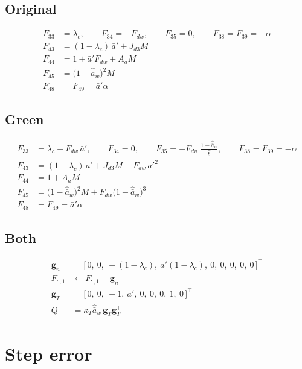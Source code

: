 \documentclass[11pt,a4paper,fontset=none]{ctexart}
\newcommand{\ba}{\bar{a}}
\newcommand{\ap}{\ba'}
\newcommand{\ah}{\hat{\ba}_w}
\newcommand{\bh}{\hat{b}}
\begin{document}
\subsection*{Original}

\begin{align*}
F_{33} &= \lambda_c, \qquad F_{34} = -F_{dw}, \qquad F_{35} = 0, \qquad F_{38} = F_{39} = -\alpha \\
F_{43} &= (1-\lambda_c)\,\ap + J_{d3}M \\
F_{44} &= 1 + \ap F_{dw} + A_a M \\
F_{45} &= \bigl(1-\ah\bigr)^{2}M \\
F_{48} &= F_{49} = \ap\alpha
\end{align*}

\subsection*{Green}

\begin{align*}
F_{33} &= \lambda_c + F_{dw}\,\ap, \qquad F_{34} = 0, \qquad F_{35} = -F_{dw}\,\frac{1-\ah}{\bh}, \qquad F_{38} = F_{39} = -\alpha \\
F_{43} &= (1-\lambda_c)\,\ap + J_{d3}M - F_{dw}\,\ap^{2} \\
F_{44} &= 1 + A_a M \\
F_{45} &= \bigl(1-\ah\bigr)^{2}M + F_{dw}\bigl(1-\ah\bigr)^{3} \\
F_{48} &= F_{49} = \ap\alpha
\end{align*}

\subsection*{Both}

\begin{align*}
\mathbf{g}_n &= \bigl[\,0,\ 0,\ -(1-\lambda_c),\ \ap(1-\lambda_c),\ 0,\ 0,\ 0,\ 0,\ 0\,\bigr]^{\top} \\
F_{:,1} &\leftarrow F_{:,1} - \mathbf{g}_n \\
\mathbf{g}_T &= \bigl[\,0,\ 0,\ -1,\ \ap,\ 0,\ 0,\ 0,\ 1,\ 0\,\bigr]^{\top} \\
Q &= \kappa_T\ah\,\mathbf{g}_T\mathbf{g}_T^{\top}
\end{align*}

\section{Step error}
\end{document}
